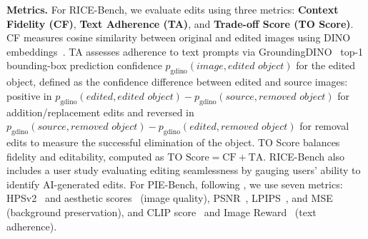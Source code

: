 \documentclass{article}
\begin{document}
\textbf{Metrics.}  For RICE-Bench, we evaluate edits using three metrics: \textbf{Context Fidelity (CF)}, \textbf{Text Adherence (TA)}, and \textbf{Trade-off Score (TO Score)}. CF measures cosine similarity between original and edited images using DINO embeddings~\citep{caron2021emerging}. TA assesses adherence to text prompts via GroundingDINO~\citep{liu2024grounding} top-1 bounding-box prediction confidence $p_{\text{gdino}}(\textit{image}, \textit{edited object})$ for the edited object, defined as the confidence difference between edited and source images: positive in $p_{\text{gdino}}(\textit{edited}, \textit{edited object})-p_{\text{gdino}}(\textit{source}, \textit{removed object})$ for addition/replacement edits and reversed in $p_{\text{gdino}}(\textit{source}, \textit{removed object})-p_{\text{gdino}}(\textit{edited}, \textit{removed object})$ for removal edits to measure the successful elimination of the object. TO Score balances fidelity and editability, computed as $\text{TO Score} = \text{CF} + \text{TA}$. RICE-Bench also includes a user study evaluating editing seamlessness by gauging users' ability to identify AI-generated edits. For PIE-Bench, following \citet{zhu2025kv}, we use seven metrics: HPSv2~\citep{wu2023human} and aesthetic scores~\citep{schuhmann2022laionb} (image quality), PSNR~\citep{huynh2008scope}, LPIPS~\citep{zhang2018perceptual}, and MSE (background preservation), and CLIP score~\citep{radford2021learning} and Image Reward~\citep{xu2023imagereward} (text adherence).

\end{document}
